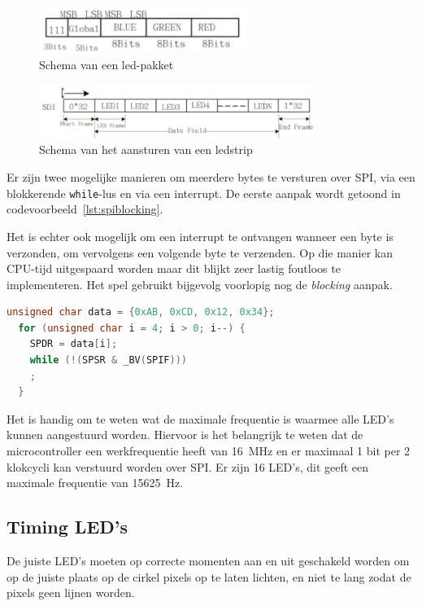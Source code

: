 \documentclass[a4paper, 12pt]{article}
\begin{document}
\begin{figure}
  \centering
  \includegraphics[width=0.6\textwidth]{afbeeldingen/ledpakket.png}
  \caption{Schema van een led-pakket}
  \label{fig:ledpakket}
\end{figure}

\begin{figure}
  \centering
  \includegraphics[width=0.8\textwidth]{afbeeldingen/ledcontrol.png}
  \caption{Schema van het aansturen van een ledstrip}
  \label{fig:ledcontrol}
\end{figure}

Er zijn twee mogelijke manieren om meerdere bytes te versturen over SPI,
via een blokkerende \texttt{while}-lus en via een interrupt.
De eerste aanpak wordt getoond in codevoorbeeld~\ref{lst:spiblocking}.

Het is echter ook mogelijk om een interrupt te ontvangen wanneer een byte is
verzonden,
om vervolgens een volgende byte te verzenden. Op die manier kan CPU-tijd
uitgespaard worden maar dit blijkt zeer lastig foutloos te implementeren.
Het spel gebruikt bijgevolg voorlopig nog de \textit{blocking} aanpak.

\begin{lstlisting}[frame=tb,language=C,float,caption={Blocking SPI in C},label={lst:spiblocking}]
  unsigned char data = {0xAB, 0xCD, 0x12, 0x34};
  for (unsigned char i = 4; i > 0; i--) {
    SPDR = data[i];
    while (!(SPSR & _BV(SPIF)))
    ;
  }
\end{lstlisting}

Het is handig om te weten wat de maximale frequentie is waarmee alle LED's
kunnen aangestuurd worden.
Hiervoor is het belangrijk te weten dat de microcontroller
een werkfrequentie heeft van \SI{16}{\mega\hertz}
en er maximaal 1 bit per 2 klokcycli kan verstuurd worden over SPI.
Er zijn 16 LED's, dit geeft een maximale frequentie van \SI{15625}{\hertz}.

\subsection{Timing LED's}
\label{sec:ledtiming}
De juiste LED's moeten op correcte momenten aan en uit geschakeld worden
om op de juiste plaats op de cirkel pixels op te laten lichten,
en niet te lang zodat de pixels geen lijnen worden.
\end{document}
